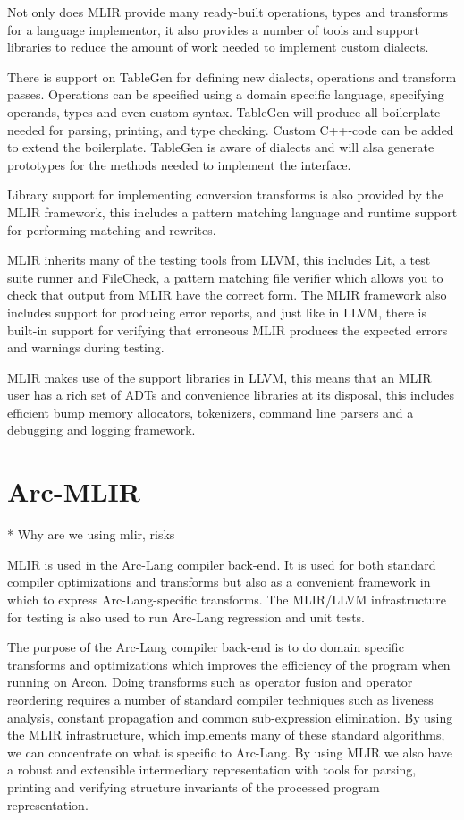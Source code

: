 Not only does MLIR provide many ready-built operations, types and
transforms for a language implementor, it also provides a number of
tools and support libraries to reduce the amount of work needed to
implement custom dialects.

There is support on TableGen for defining new dialects, operations and
transform passes. Operations can be specified using a domain specific
language, specifying operands, types and even custom syntax. TableGen
will produce all boilerplate needed for parsing, printing, and type
checking. Custom C++-code can be added to extend the
boilerplate. TableGen is aware of dialects and will alsa generate
prototypes for the methods needed to implement the interface.

Library support for implementing conversion transforms is also
provided by the MLIR framework, this includes a pattern matching
language and runtime support for performing matching and rewrites.

MLIR inherits many of the testing tools from LLVM, this includes Lit,
a test suite runner and FileCheck, a pattern matching file verifier
which allows you to check that output from MLIR have the correct
form. The MLIR framework also includes support for producing error
reports, and just like in LLVM, there is built-in support for
verifying that erroneous MLIR produces the expected errors and
warnings during testing.

MLIR makes use of the support libraries in LLVM, this means that an
MLIR user has a rich set of ADTs and convenience libraries at its
disposal, this includes efficient bump memory allocators, tokenizers,
command line parsers and a debugging and logging framework.

\section{Arc-MLIR}


* Why are we using mlir, risks

MLIR is used in the Arc-Lang compiler back-end. It is used for both
standard compiler optimizations and transforms but also as a
convenient framework in which to express Arc-Lang-specific
transforms. The MLIR/LLVM infrastructure for testing is also used to
run Arc-Lang regression and unit tests.

The purpose of the Arc-Lang compiler back-end is to do domain specific
transforms and optimizations which improves the efficiency of the
program when running on Arcon. Doing transforms such as operator
fusion and operator reordering requires a number of standard compiler
techniques such as liveness analysis, constant propagation and common
sub-expression elimination. By using the MLIR infrastructure, which
implements many of these standard algorithms, we can concentrate on
what is specific to Arc-Lang. By using MLIR we also have a robust and
extensible intermediary representation with tools for parsing,
printing and verifying structure invariants of the processed program
representation.

